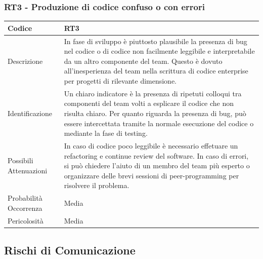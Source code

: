 \documentclass[10pt]{article}
\begin{document}
{    \subsubsection{RT3 - Produzione di codice confuso o con errori}
    \label{RT3}
    \begin{tabularx}{\textwidth}{|l|X|}
    \hline
    Codice & RT3 \\
    \hline
    Descrizione & In fase di sviluppo è piuttosto plausibile la presenza di bug nel codice o di codice non facilmente leggibile e interpretabile da un altro componente del team. Questo è dovuto all'inesperienza del team nella scrittura di codice enterprise per progetti di rilevante dimensione. \\
    \hline
    Identificazione & Un chiaro indicatore è la presenza di ripetuti colloqui tra componenti del team volti a esplicare il codice che non risulta chiaro. Per quanto riguarda la presenza di bug, può essere intercettata tramite la normale esecuzione del codice o mediante la fase di testing.   \\
    \hline
    Possibili Attenuazioni & In caso di codice poco leggibile è necessario effetuare un refactoring e continue review del software. In caso di errori, si può chiedere l'aiuto di un membro del team più esperto o organizzare delle brevi sessioni di peer-programming per risolvere il problema. \\
    \hline
    Probabilità Occorrenza &  Media \\
    \hline
    Pericolosità & Media \\ 
    \hline
    \end{tabularx}

\subsection{Rischi di Comunicazione}
}
\end{document}
